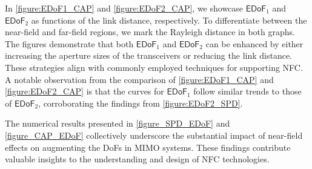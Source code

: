 \documentclass[journal]{IEEEtran}
\theoremstyle{definition}
\begin{document}
In {\figurename} {\ref{figure:EDoF1_CAP}} and {\figurename} {\ref{figure:EDoF2_CAP}}, we showcase ${\mathsf{EDoF}}_1$ and ${\mathsf{EDoF}}_2$ as functions of the link distance, respectively. To differentiate between the near-field and far-field regions, we mark the Rayleigh distance in both graphs. The figures demonstrate that both ${\mathsf{EDoF}}_1$ and ${\mathsf{EDoF}}_2$ can be enhanced by either increasing the aperture sizes of the transceivers or reducing the link distance. These strategies align with commonly employed techniques for supporting NFC. A notable observation from the comparison of {\figurename} {\ref{figure:EDoF1_CAP}} and {\figurename} {\ref{figure:EDoF2_CAP}} is that the curves for ${\mathsf{EDoF}}_1$ follow similar trends to those of ${\mathsf{EDoF}}_2$, corroborating the findings from {\figurename} {\ref{figure:EDoF2_SPD}}.

The numerical results presented in {\figurename} {\ref{figure_SPD_EDoF}} and {\figurename} {\ref{figure_CAP_EDoF}} collectively underscore the substantial impact of near-field effects on augmenting the DoFs in MIMO systems. These findings contribute valuable insights to the understanding and design of NFC technologies.
\end{document}
